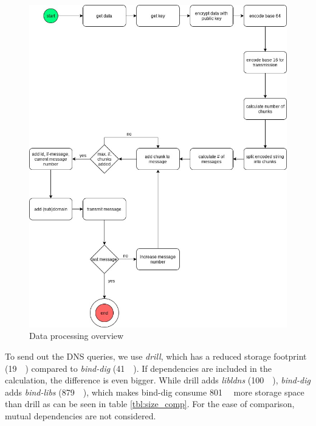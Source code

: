    \begin{figure}[h!]
        \centering
        \includegraphics[width=\textwidth]{latex/figures/data_processing.jpg}
        \caption{Data processing overview}
        \label{fig:data_proccess}
    \end{figure}
    
    \newpage
    
    To send out the DNS queries, we use \textit{drill}, which has a reduced storage footprint (\SIlist{19}{\kilo\byte}) compared to \textit{bind-dig} (\SIlist{41}{\kilo\byte}). If dependencies are included in the calculation, the difference is even bigger. While drill adds \textit{libldns} (\SIlist{100}{\kilo\byte}), \textit{bind-dig}
    adds \textit{bind-libs} (\SIlist{879}{\kilo\byte}), which makes bind-dig consume \SIlist{801}{\kilo\byte} more storage space than drill as can be seen in table \ref{tbl:size_comp}. For the ease of comparison, mutual dependencies are not considered.\\
    
